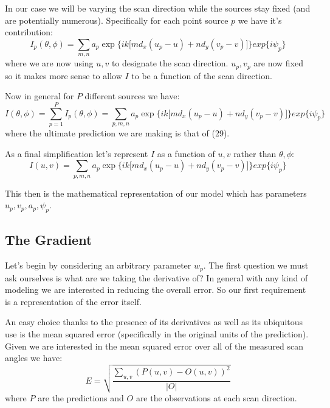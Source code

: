 \documentclass[10pt,a4paper]{article}
\begin{document}
In our case we will be varying the scan direction while the sources stay fixed (and are potentially numerous). Specifically for each point source $p$ we have it's contribution:
\begin{equation}
I_p(\theta, \phi) = \sum_{m,n}a_p\exp\lbrace ik \lbrack md_x(u_p-u)+nd_y(v_p-v)\rbrack\rbrace exp\lbrace i\psi_p \rbrace
\end{equation}
where we are now using $u,v$ to designate the scan direction. $u_p, v_p$ are now fixed so it makes more sense to allow $I$ to be a function of the scan direction. 

Now in general for $P$ different sources we have:
\begin{equation}
I(\theta, \phi) = \sum_{p=1}^{P} I_p(\theta, \phi)= \sum_{p,m,n}a_p\exp\lbrace ik \lbrack md_x(u_p-u)+nd_y(v_p-v)\rbrack\rbrace exp\lbrace i\psi_p \rbrace
\end{equation}
where the ultimate prediction we are making is that of (29).

As a final simplification let's represent $I$ as a function of $u,v$ rather than $\theta, \phi$:
\begin{equation}
I(u, v) = \sum_{p,m,n}a_p\exp\lbrace ik \lbrack md_x(u_p-u)+nd_y(v_p-v)\rbrack\rbrace exp\lbrace i\psi_p \rbrace
\end{equation}

This then is the mathematical representation of our model which has parameters $u_p,v_p,a_p,\psi_p$.

\subsection{The Gradient}
Let's begin by considering an arbitrary parameter $w_p$. The first question we must ask ourselves is what are we taking the derivative of? In general with any kind of modeling we are interested in reducing the overall error. So our first requirement is a representation of the error itself.

An easy choice thanks to the presence of its derivatives as well as its ubiquitous use is the mean squared error (specifically in the original units of the prediction). Given we are interested in the mean squared error over all of the measured scan angles we have:
\begin{equation}
E = \sqrt{\frac{\sum_{u,v}(P(u,v) - O(u,v))^2}{|O|}} 
\end{equation}
where $P$ are the predictions and $O$ are the observations at each scan direction.
\end{document}

